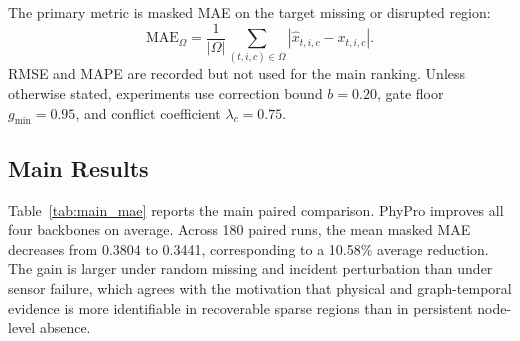\documentclass[preprint,12pt]{elsarticle}
\begin{document}
The primary metric is masked MAE on the target missing or disrupted region:
\begin{equation}
  \mathrm{MAE}_{\Omega}
  =
  \frac{1}{|\Omega|}
  \sum_{(t,i,c)\in\Omega}
  |\hat{x}_{t,i,c}-x_{t,i,c}|.
\end{equation}
RMSE and MAPE are recorded but not used for the main ranking. Unless otherwise stated, experiments use correction bound $b=0.20$, gate floor $g_{\min}=0.95$, and conflict coefficient $\lambda_c=0.75$.

\subsection{Main Results}
Table~\ref{tab:main_mae} reports the main paired comparison. PhyPro improves all four backbones on average. Across 180 paired runs, the mean masked MAE decreases from 0.3804 to 0.3441, corresponding to a 10.58\% average reduction. The gain is larger under random missing and incident perturbation than under sensor failure, which agrees with the motivation that physical and graph-temporal evidence is more identifiable in recoverable sparse regions than in persistent node-level absence.
\end{document}
